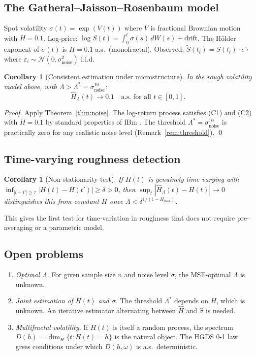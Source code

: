 \documentclass[11pt,a4paper]{article}
\newtheorem{corollary}[theorem]{Corollary}
\theoremstyle{definition}
\theoremstyle{remark}
\newcommand{\Hhat}{\hat{H}_\Lambda}
\begin{document}
\subsection{The Gatheral--Jaisson--Rosenbaum model}

Spot volatility $\sigma(t)=\exp(V(t))$ where $V$ is fractional
Brownian motion with $H=0.1$. Log-price:
$\log S(t)=\int_0^t\sigma(s)\,dW(s)+\text{drift}$.
The H\"{o}lder exponent of $\sigma(t)$ is $H=0.1$ a.s.\ (monofractal).
Observed: $\tilde S(t_i)=S(t_i)\cdot e^{\varepsilon_i}$ where
$\varepsilon_i\sim\mathcal{N}(0,\sigma_{\mathrm{noise}}^2)$ i.i.d.

\begin{corollary}[Consistent estimation under microstructure]\label{cor:rVol}
In the rough volatility model above, with
$\Lambda>\Lambda^*=\sigma_{\mathrm{noise}}^{10}$:
\[
  \Hhat(t)\to 0.1\quad\text{a.s.\ for all }t\in[0,1].
\]
\end{corollary}

\begin{proof}
Apply Theorem~\ref{thm:noise}. The log-return process satisfies (C1)
and (C2) with $H=0.1$ by standard properties of fBm
\cite{nourdin2012}. The threshold $\Lambda^*=\sigma_{\mathrm{noise}}^{10}$
is practically zero for any realistic noise level (Remark~\ref{rem:threshold}).
\qed
\end{proof}

\subsection{Time-varying roughness detection}

\begin{corollary}[Non-stationarity test]\label{cor:nonstat}
If $H(t)$ is genuinely time-varying with
$\inf_{|t-t'|\ge\tau}|H(t)-H(t')|\ge\delta>0$,
then $\sup_t|\Hhat(t)-H(t)|\to0$ distinguishes this from constant $H$
once $\Lambda<\delta^{1/(1-H_{\max})}$.
\end{corollary}

This gives the first test for time-variation in roughness that does
not require pre-averaging or a parametric model.

\subsection{Open problems}

\begin{enumerate}
\item \emph{Optimal $\Lambda$.} For given sample size $n$ and noise
  level $\sigma$, the MSE-optimal $\Lambda$ is unknown.
\item \emph{Joint estimation of $H(t)$ and $\sigma$.} The threshold
  $\Lambda^*$ depends on $H$, which is unknown. An iterative estimator
  alternating between $\hat H$ and $\hat\sigma$ is needed.
\item \emph{Multifractal volatility.} If $H(t)$ is itself a random
  process, the spectrum $D(h)=\dim_H\{t:H(t)=h\}$ is the natural
  object. The HGDS 0-1 law \cite{hgds01law} gives conditions under
  which $D(h,\omega)$ is a.s.\ deterministic.
\end{enumerate}
\end{document}
